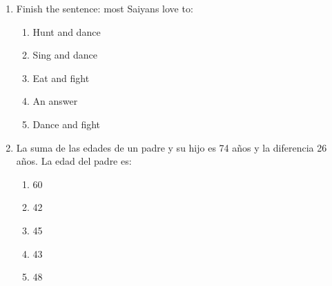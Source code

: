 \documentclass[letterpaper,addpoints,answers,twocolumn,10pt]{exam}
\begin{document}
\begin{enumerate}[leftmargin=.2in]
\begin{enumerate}[noitemsep,leftmargin=0in]
\end{enumerate}



\item  Finish the sentence: most Saiyans love to:


\begin{enumerate}[noitemsep,leftmargin=0in]


\item  Hunt and dance
\item  Sing and dance
\item  Eat and fight
\item  An answer
\item  Dance and fight


\end{enumerate}



\item  La suma de las edades de un padre y su hijo es 74 años y la diferencia 26 años. La edad del padre es:


\begin{enumerate}[noitemsep,leftmargin=0in]


\item  60
\item  42
\item  45
\item  43
\item  48


\end{enumerate}



\end{enumerate}
\end{document}
